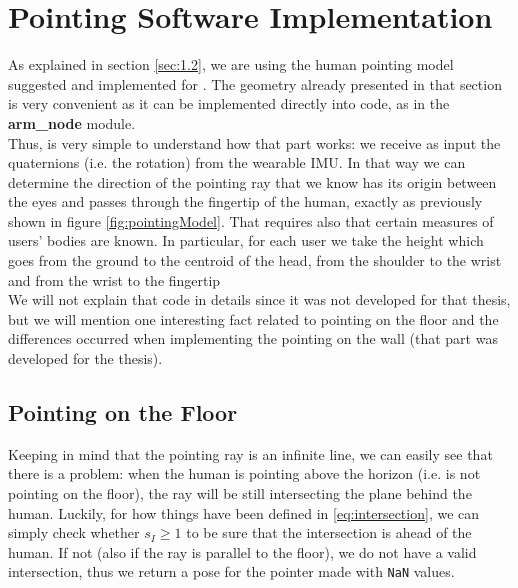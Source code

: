 \section{Pointing Software Implementation}
As explained in section \ref{sec:1.2}, we are using the human pointing model suggested and implemented for \cite{gromov2018robot}. The geometry already presented in that section is very convenient as it can be implemented directly into code, as in the \textbf{arm\_node} module.\\
Thus, is very simple to understand how that part works: we receive as input the quaternions (i.e. the rotation) from the wearable \ac{IMU}. In that way we can determine the direction of the pointing ray that we know has its origin between the eyes and passes through the fingertip of the human, exactly as previously shown in figure \ref{fig:pointingModel}. That requires also that certain measures of users' bodies are known. In particular, for each user we take the height which goes from the ground to the centroid of the head, from the shoulder to the wrist and from the wrist to the fingertip\\ 
We will not explain that code in details since it was not developed for that thesis, but we will mention one interesting fact related to pointing on the floor and the differences occurred when implementing the pointing on the wall (that part was developed for the thesis).
\subsection{Pointing on the Floor}
Keeping in mind that the pointing ray is an infinite line, we can easily see that there is a problem: when the human is pointing above the horizon (i.e. is not pointing on the floor), the ray will be still intersecting the plane behind the human. Luckily, for how things have been defined in \ref{eq:intersection}, we can simply check whether $s_I \geq 1$ to be sure that the intersection is ahead of the human. If not (also if the ray is parallel to the floor), we do not have a valid intersection, thus we return a pose for the pointer made with \texttt{NaN} values.

